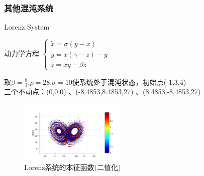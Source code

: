 \documentclass{beamer}
\begin{document}
	\subsubsection{其他混沌系统}
		\begin{frame}{Lorenz System}
		\begin{block}{动力学方程}
			\centering
			\begin{math}
			\begin{cases}
			\dot{x}=\sigma (y-x)\\
			\dot{y}=x(\gamma-z)-y\\
			\dot{z}=xy-\beta z
			\end{cases}\
			\end{math}
		\end{block}
		取$\beta=\frac{8}{3}$,$\rho=28$,$\sigma=10$使系统处于混沌状态，初始点(-1,3,4)\\
		三个不动点：(0,0,0)
、(-8.4853,8.4853,27)
、(8.4853,-8,4853,27)
		\begin{figure}
			\begin{minipage}{0.5\linewidth}
				\centering
				\includegraphics[width=2in]{figure/lorenz_eigen_bin}
				\caption{Lorenz系统的本征函数(二值化)}
			\end{minipage}
		\end{figure}
		\end{frame}
\end{document}
